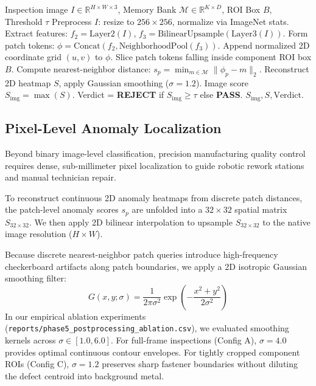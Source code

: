 \documentclass[journal,twocolumn]{IEEEtran}
\begin{document}
\begin{algorithm}[t]
\caption{AutoVI Config C Inspection and Scoring Pipeline}
\label{alg:inspection}
\begin{algorithmic}[1]
\REQUIRE Inspection image $I \in \mathbb{R}^{H \times W \times 3}$, Memory Bank $\mathcal{M} \in \mathbb{R}^{K \times D}$, ROI Box $B$, Threshold $\tau$
\STATE Preprocess $I$: resize to $256 \times 256$, normalize via ImageNet stats.
\STATE Extract features: $f_2 = \text{Layer2}(I)$, $f_3 = \text{BilinearUpsample}(\text{Layer3}(I))$.
\STATE Form patch tokens: $\phi = \text{Concat}(f_2, \text{NeighborhoodPool}(f_3))$.
\STATE Append normalized 2D coordinate grid $(u, v)$ to $\phi$.
\STATE Slice patch tokens falling inside component ROI box $B$.
    \STATE Compute nearest-neighbor distance: $s_p = \min_{m \in \mathcal{M}} \|\phi_p - m\|_2$.
\ENDFOR
\STATE Reconstruct 2D heatmap $S$, apply Gaussian smoothing ($\sigma = 1.2$).
\STATE Image score $S_{\text{img}} = \max(S)$.
\STATE Verdict = \textbf{REJECT} if $S_{\text{img}} \ge \tau$ else \textbf{PASS}.
\RETURN $S_{\text{img}}, S, \text{Verdict}$.
\end{algorithmic}
\end{algorithm}

\subsection{Pixel-Level Anomaly Localization}
Beyond binary image-level classification, precision manufacturing quality control requires dense, sub-millimeter pixel localization to guide robotic rework stations and manual technician repair.

To reconstruct continuous 2D anomaly heatmaps from discrete patch distances, the patch-level anomaly scores $s_p$ are unfolded into a $32 \times 32$ spatial matrix $S_{32 \times 32}$. We then apply 2D bilinear interpolation to upsample $S_{32 \times 32}$ to the native image resolution ($H \times W$).

Because discrete nearest-neighbor patch queries introduce high-frequency checkerboard artifacts along patch boundaries, we apply a 2D isotropic Gaussian smoothing filter:
\begin{equation}
G(x, y; \sigma) = \frac{1}{2\pi\sigma^2} \exp\left( -\frac{x^2 + y^2}{2\sigma^2} \right)
\end{equation}
In our empirical ablation experiments (\texttt{reports/phase5\_postprocessing\_ablation.csv}), we evaluated smoothing kernels across $\sigma \in [1.0, 6.0]$. For full-frame inspections (Config A), \textbf{$\sigma = 4.0$} provides optimal continuous contour envelopes. For tightly cropped component ROIs (Config C), \textbf{$\sigma = 1.2$} preserves sharp fastener boundaries without diluting the defect centroid into background metal.
\end{document}
